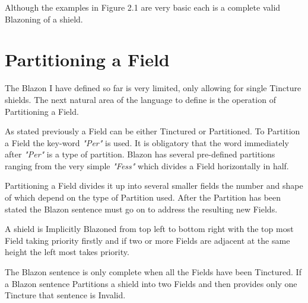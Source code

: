 Although the examples in Figure 2.1 are very basic each is a complete valid Blazoning of a shield.

\section{Partitioning a Field}
The Blazon I have defined so far is very limited, only allowing for single Tincture shields.  The next natural area of the language to define is the operation of Partitioning a Field.  

As stated previously a Field can be either Tinctured or Partitioned.  To Partition a Field the key-word \emph{"Per"} is used. It is obligatory that the word immediately after \emph{"Per"} is a type of partition.  Blazon has several pre-defined partitions ranging from the very simple \emph{"Fess"} which divides a Field horizontally in half. 

Partitioning a Field divides it up into several smaller fields the number and shape of which depend on the type of Partition used.  After the Partition has been stated the Blazon sentence must go on to address the resulting new Fields. 

A shield is Implicitly Blazoned from top left to bottom right with the top most Field taking priority firstly and if two or more Fields are adjacent at the same height the left most takes priority.  

The Blazon sentence is only complete when all the Fields have been Tinctured.  If a Blazon sentence Partitions a shield into two Fields and then provides only one Tincture that sentence is Invalid.  




